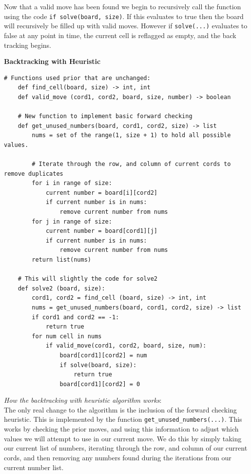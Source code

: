 \documentclass{article}
\begin{document}
	Now that a valid move has been found we begin to recursively call the function using the code \verb|if solve(board, size)|. If this evaluates to true
	then the board will recursively be filled up with valid moves. However if \verb|solve(...)| evaluates to false at any point in time, the current cell is reflagged 
	as empty, and the back tracking begins. \\



\pagebreak

\noindent \textbf{Backtracking with Heuristic}

\begin{lstlisting}[frame=single]
	# Functions used prior that are unchanged:
	def find_cell(board, size) -> int, int
	def valid_move (cord1, cord2, board, size, number) -> boolean

	# New function to implement basic forward checking
	def get_unused_numbers(board, cord1, cord2, size) -> list
		nums = set of the range(1, size + 1) to hold all possible values.

		# Iterate through the row, and column of current cords to remove duplicates
		for i in range of size:
			current number = board[i][cord2]
			if current number is in nums:
				remove current number from nums
		for j in range of size:
			current number = board[cord1][j]
			if current number is in nums:
				remove current number from nums
		return list(nums)

	# This will slightly the code for solve2
	def solve2 (board, size):
		cord1, cord2 = find_cell (board, size) -> int, int
		nums = get_unused_numbers(board, cord1, cord2, size) -> list
		if cord1 and cord2 == -1:
			return true
		for num cell in nums
			if valid_move(cord1, cord2, board, size, num):
				board[cord1][cord2] = num
				if solve(board, size):
					return true
				board[cord1][cord2] = 0

\end{lstlisting}

\textit{How the backtracking with heuristic algorithm works}: \\

The only real change to the algorithm is the inclusion of the forward checking heuristic.
This is implemented by the function \verb|get_unused_numbers(...)|. This works by checking the prior moves, and
using this information to adjust which values we will attempt to use in our current move. We do this by simply taking our current list 
of numbers, iterating through the row, and column of our current cords, and then removing any numbers found during the iterations from our 
current number list.
\end{document}

